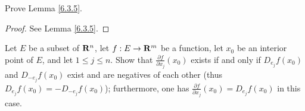 \exercisesection

\begin{exercise}\label{ex 6.3.1}
    Prove Lemma \ref{6.3.5}.
\end{exercise}

\begin{proof}
    See Lemma \ref{6.3.5}.
\end{proof}

\begin{exercise}\label{ex 6.3.2}
    Let \(E\) be a subset of \(\mathbf{R}^n\), let \(f : E \to \mathbf{R}^m\) be a function, let \(x_0\) be an interior point of \(E\), and let \(1 \leq j \leq n\).
    Show that \(\frac{\partial f}{\partial x_j}(x_0)\) exists if and only if \(D_{e_j} f(x_0)\) and \(D_{-e_j} f(x_0)\) exist and are negatives of each other
    (thus \(D_{e_j} f(x_0) = -D_{-e_j} f(x_0)\));
    furthermore, one has \(\frac{\partial f}{\partial x_j}(x_0) = D_{e_j} f(x_0)\) in this case.
\end{exercise}

